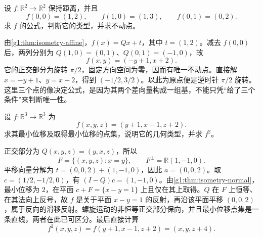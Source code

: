\begin{exercise}
	\label{g1:ex:isometry-frame}
	设 \(f\colon\mathbb R^2\rightarrow\mathbb R^2\) 保持距离，并且
	\[
		f(0,0)=(1,2),\qquad f(1,0)=(1,3),\qquad f(0,1)=(0,2).
	\]
	求 \(f\) 的公式，判断它的类型，并求不动点。
\end{exercise}
\begin{solution}
	由\cref{g1:thm:isometry-affine}，\(f(x)=Qx+t\)，其中 \(t=(1,2)\)。减去 \(f(0,0)\) 后，两列分别为 \(Q(1,0)=(0,1)\)、\(Q(0,1)=(-1,0)\)，故
	\[
		f(x,y)=(-y+1,x+2).
	\]
	它的正交部分为旋转 \(\pi/2\)，固定方向空间为零，因而有唯一不动点。直接解 \(x=-y+1\)、\(y=x+2\)，得到 \((-1/2,3/2)\)。以此为原点便是逆时针 \(\pi/2\) 旋转。这里三个点的像决定公式，是因为其两个差向量构成一组基，不能只凭“给了三个条件”来判断唯一性。
\end{solution}

\begin{exercise}
	\label{g1:ex:space-glide}
	设 \(f\colon\mathbb R^3\rightarrow\mathbb R^3\) 为
	\[
		f(x,y,z)=(y+1,x-1,z+2).
	\]
	求其最小位移及取得最小位移的点集，说明它的几何类型，并求 \(f^2\)。
\end{exercise}
\begin{solution}
	正交部分为 \(Q(x,y,z)=(y,x,z)\)，所以
	\[
		F=\{(x,y,z):x=y\},\qquad F^\perp=\mathbb R(1,-1,0).
	\]
	平移向量分解为 \(t=(0,0,2)+(1,-1,0)\)，因此 \(a=(0,0,2)\)。取 \(c=(1/2,-1/2,0)\)，有 \((I-Q)c=(1,-1,0)\)。由\cref{g1:thm:isometry-normal}，最小位移为 \(2\)，在平面 \(c+F=\{x-y=1\}\) 上且仅在其上取得。\(Q\) 在 \(F\) 上恒等、在其法向上反号，故 \(f\) 是关于平面 \(x-y=1\) 的反射，再沿该平面平移 \((0,0,2)\)，属于反向的滑移反射。螺旋运动的非恒等正交部分保向，并且最小位移点集是一条直线，两者在此已可区分。最后直接计算
	\[
		f^2(x,y,z)=f(y+1,x-1,z+2)=(x,y,z+4).
	\]
\end{solution}

